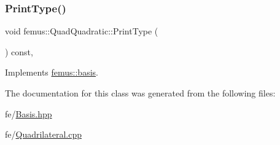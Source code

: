 \subsubsection{\texorpdfstring{Print\+Type()}{PrintType()}}
{\footnotesize\ttfamily void femus\+::\+Quad\+Quadratic\+::\+Print\+Type (\begin{DoxyParamCaption}{ }\end{DoxyParamCaption}) const\hspace{0.3cm}{\ttfamily [inline]}, {\ttfamily [virtual]}}



Implements \mbox{\hyperlink{classfemus_1_1basis_abbae7bf8f31ec5793c911bc6d4ea0572}{femus\+::basis}}.



The documentation for this class was generated from the following files\+:\begin{DoxyCompactItemize}
\item 
fe/\mbox{\hyperlink{_basis_8hpp}{Basis.\+hpp}}\item 
fe/\mbox{\hyperlink{_quadrilateral_8cpp}{Quadrilateral.\+cpp}}\end{DoxyCompactItemize}
